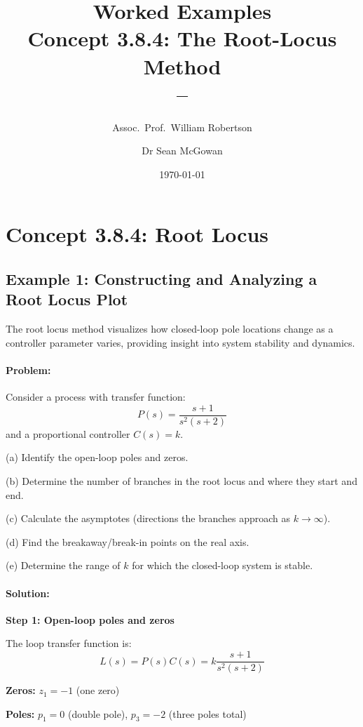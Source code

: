 \documentclass[11pt,a4paper]{article}
\title{\textbf{Worked Examples}\\[0.5em]
\large Concept 3.8.4: The Root-Locus Method\\[0.3em]
\normalsize \coursesubtitle{} -- \coursetitle}
\author{Assoc.\ Prof.\ William Robertson \and Dr Sean McGowan}
\date{\today}
\begin{document}
\maketitle
\tableofcontents
\newpage

\section{Concept 3.8.4: Root Locus}

\subsection{Example 1: Constructing and Analyzing a Root Locus Plot}

The root locus method visualizes how closed-loop pole locations change as a controller parameter varies, providing insight into system stability and dynamics.

\paragraph{Problem:}
Consider a process with transfer function:
\begin{equation}
  P(s) = \frac{s+1}{s^2(s+2)}
\end{equation}
and a proportional controller $C(s) = k$.

(a) Identify the open-loop poles and zeros.

(b) Determine the number of branches in the root locus and where they start and end.

(c) Calculate the asymptotes (directions the branches approach as $k \to \infty$).

(d) Find the breakaway/break-in points on the real axis.

(e) Determine the range of $k$ for which the closed-loop system is stable.

\paragraph{Solution:}

\textbf{Step 1: Open-loop poles and zeros}

The loop transfer function is:
\begin{equation}
  L(s) = P(s)C(s) = k\frac{s+1}{s^2(s+2)}
\end{equation}

\textbf{Zeros:} $z_1 = -1$ (one zero)

\textbf{Poles:} $p_1 = 0$ (double pole), $p_3 = -2$ (three poles total)
\end{document}

